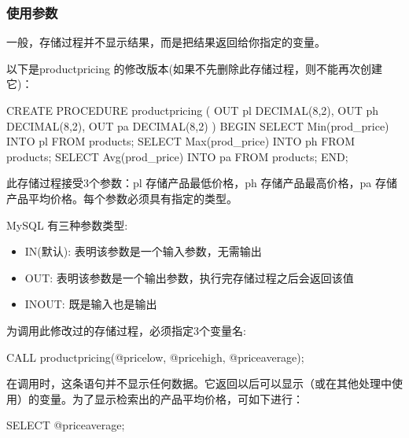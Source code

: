
\subsubsection{使用参数}

一般，存储过程并不显示结果，而是把结果返回给你指定的变量。

以下是productpricing 的修改版本(如果不先删除此存储过程，则不能再次创建它)：

\begin{sql}
CREATE PROCEDURE productpricing (
    OUT pl DECIMAL(8,2),
    OUT ph DECIMAL(8,2),
    OUT pa DECIMAL(8,2)
)
BEGIN
    SELECT Min(prod_price) INTO pl
        FROM products;
    SELECT Max(prod_price) INTO ph
        FROM products;
    SELECT Avg(prod_price) INTO pa
        FROM products;
END;
\end{sql}

此存储过程接受3个参数：pl 存储产品最低价格，ph 存储产品最高价格，pa 存储产品平均价格。每个参数必须具有指定的类型。

MySQL 有三种参数类型:
\begin{itemize}
    \item IN(默认): 表明该参数是一个输入参数，无需输出
    \item OUT: 表明该参数是一个输出参数，执行完存储过程之后会返回该值
    \item INOUT: 既是输入也是输出
\end{itemize}

为调用此修改过的存储过程，必须指定3个变量名:

\begin{sql}
CALL productpricing(@pricelow, @pricehigh, @priceaverage);
\end{sql}


在调用时，这条语句并不显示任何数据。它返回以后可以显示（或在其他处理中使用）的变量。为了显示检索出的产品平均价格，可如下进行：

\begin{sql}
SELECT @priceaverage;
\end{sql}

